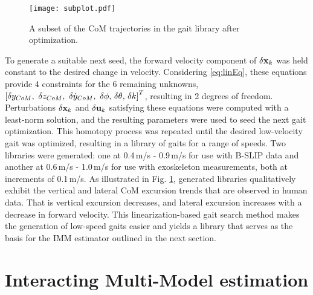 \begin{figure}
	\centering
	\texttt{[image: subplot.pdf]}
	\vspace{-1em}
	\caption{A subset of the CoM trajectories in the gait library after optimization.}\label{fig:library}
\end{figure}

To generate a suitable next seed, the forward velocity component of $ \delta \mathbf{x}_k$ was held constant to the desired change in velocity. Considering \eqref{eq:linEq}, these equations provide 4 constraints for the 6 remaining unknowns, $ \left[\delta y_\com,\ \delta z_\com,\ \delta\dot{y}_\com,\ \delta \phi,\, \delta \theta,\, \delta k\right]^T  $, resulting in 2 degrees of freedom. Perturbations $\delta \mathbf{x}_k$ and $\delta \mathbf{u}_k$ satisfying these equations were computed with a least-norm solution, and the resulting parameters were used to seed the next gait optimization. This homotopy process was repeated until the desired low-velocity gait was optimized, resulting in a library of gaits for a range of speeds. Two libraries were generated: one at 0.4\,m/s - 0.9\,m/s for use with B-SLIP data and another at 0.6\,m/s - 1.0\,m/s for use with exoskeleton measurements, both at increments of 0.1\,m/s. As illustrated in Fig. \ref{fig:library}, generated libraries qualitatively exhibit the vertical and lateral CoM excursion trends that are observed in human data. That is vertical excursion decreases, and lateral excursion increases with a decrease in forward velocity. This linearization-based gait search method makes the generation of low-speed gaits easier and yields a library that serves as the basis for the IMM estimator outlined in the next section.

\section{Interacting Multi-Model estimation} \label{sec:IMM}

